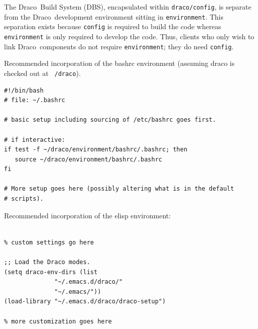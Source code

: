 \documentclass[note]{ResearchNote}
\newcommand{\draco}{Draco}
\begin{document}
The \draco\ Build System (DBS), encapsulated within
\texttt{draco/config}, is separate from the \draco\ development
environment sitting in \texttt{environment}.  This separation exists
because \texttt{config} is required to build the code whereas
\texttt{environment} is only required to develop the code.  Thus,
clients who only wish to link \draco\ components do not require
\texttt{environment}; they do need \texttt{config}.

Recommended incorporation of the bashrc environment (assuming draco is
checked out at \texttt{~/draco}).
\begin{lstlisting}[basicstyle=\footnotesize, xleftmargin=0.5in, 
  xrightmargin=0.5in]
#!/bin/bash
# file: ~/.bashrc

# basic setup including sourcing of /etc/bashrc goes first.

# if interactive:
if test -f ~/draco/environment/bashrc/.bashrc; then
   source ~/draco/environment/bashrc/.bashrc
fi

# More setup goes here (possibly altering what is in the default
# scripts). 
\end{lstlisting}

Recommended incorporation of the elisp environment:
\begin{lstlisting}[basicstyle=\footnotesize, xleftmargin=0.5in, 
  xrightmargin=0.5in]
%.emacs

% custom settings go here

;; Load the Draco modes.
(setq draco-env-dirs (list
		      "~/.emacs.d/draco/"
		      "~/.emacs/"))
(load-library "~/.emacs.d/draco/draco-setup")

% more customization goes here
\end{lstlisting}
\end{document}
